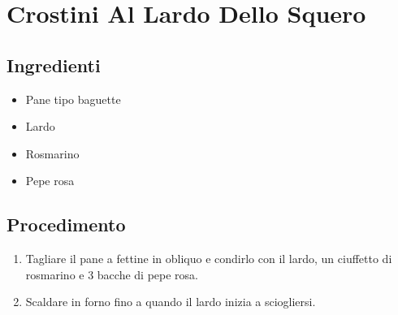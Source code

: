 \section{Crostini Al Lardo Dello Squero}
\subsection{Ingredienti}
\begin{itemize}
\item Pane tipo baguette  
\item Lardo  
\item Rosmarino  
\item Pepe rosa
\end{itemize}
\subsection{Procedimento}
\begin{enumerate}
\item  Tagliare il pane a fettine in obliquo e condirlo con il lardo, un ciuffetto di rosmarino e 3 bacche di pepe rosa.  
\item  Scaldare in forno fino a quando il lardo inizia a sciogliersi.
\end{enumerate}
